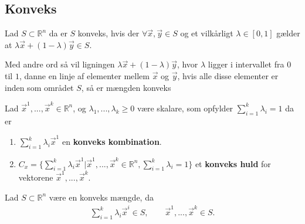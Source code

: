\subsection{Konveks}

\begin{defn} [Konveks]
Lad $S \subset \mathds{R}^n$  da er $S$ konveks, hvis der $\forall \vec{x}, \vec{y} \in S$ og et vilkårligt $\lambda \in [0,1]$ gælder at $\lambda \vec{x} + (1-\lambda) \vec{y} \in S$.
\label{def:Konveks}
\end{defn}
Med andre ord så vil ligningen $\lambda \vec{x} + (1-\lambda) \vec{y}$, hvor $\lambda$ ligger i intervallet fra $0$ til $1$, danne en linje af elementer mellem $\vec{x}$ og $\vec{y}$, hvis alle disse elementer er inden som området $S$, så er mængden konveks

\begin{defn}
Lad $\vec{x}^1, ...,\vec{x}^k \in \mathds{R}^n$, og $\lambda_1,..., \lambda_k \geq 0 $ være skalare, som opfylder $\sum_{i=1}^k \lambda_i =1$ da er
\begin{enumerate}[label=(\alph*)]
\item $\sum_{i=1}^k \lambda_i \vec{x}^1$ en \textbf{konveks kombination}.
\\ \item $C_{x} = \{\sum_{i=1}^k \lambda_i \vec{x}^1| \vec{x}^1, ...,\vec{x}^k \in \mathds{R}^n, \sum_{i=1}^k \lambda_i =1\}$ et \textbf{konveks huld} for vektorene $\vec{x}^1, ...,\vec{x}^k$. 
\end{enumerate}
\label{def:KonveksKombination}
\end{defn}

\begin{stn}
Lad $S\subset \mathds{R}^n$ være en konveks mængde, da
\begin{align*}
	\sum_{i=1}^k \lambda_i \vec{x}^i \in S, \qquad \vec{x}^1, ...,\vec{x}^k \in S.
\end{align*}
\label{stn:KonveksKombination}
\end{stn}

